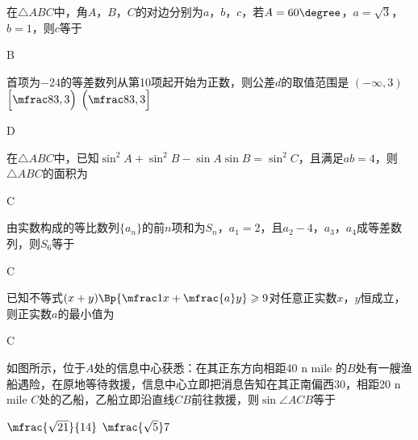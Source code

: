 \begin{exercise}
    在$\triangle{ABC}$中，角$A$，$B$，$C$的对边分别为$a$，$b$，$c$，若$A=60\degree$，$a=\sqrt3$，$b=1$，则$c$等于\xz
    \begin{answer}
      B
    \end{answer}
  \item%
    首项为$-24$的等差数列从第10项起开始为正数，则公差$d$的取值范围是\xz
       {$(-\infty,3)$}
       {$\Bigl[\mfrac83,3\Bigr)$}
       {$\Bigl(\mfrac83,3\Bigr]$}
    \begin{answer}
      D
    \end{answer}
  \item%
    在$\triangle{ABC}$中，已知$\sin^2A+\sin^2B-\sin A \sin B=\sin^2C$，且满足$ab=4$，则$\triangle{ABC}$的面积为\xz
    \begin{answer}
      C
    \end{answer}
  \item%
    由实数构成的等比数列$\{a_n\}$的前$n$项和为$S_n$，$a_1=2$，且$a_2-4$，$a_3$，$a_4$成等差数列，则$S_6$等于\xz
    \begin{answer}
      C
    \end{answer}
  \clearpage
  \item%
    已知不等式$(x+y)\Bp{\mfrac1x+\mfrac{a}y}\geqslant9$对任意正实数$x$，$y$恒成立，则正实数$a$的最小值为\xz
    \begin{answer}
      C
    \end{answer}
  \item%
    如图所示，位于$A$处的信息中心获悉：在其正东方向相距40 n mile 的$B$处有一艘渔船遇险，在原地等待救援，信息中心立即把消息告知在其正南偏西30\degree，相距20 n mile $C$处的乙船，乙船立即沿直线$CB$前往救援，则$\sin\angle{ACB}$等于\xz
    \begin{minipage}[t]{0.5\linewidth}\vspace{-0.5\baselineskip}
       {$\mfrac{\sqrt{21}}{14}$\hspace{5em}}
       {$\mfrac{\sqrt5}7$\hspace{5em}}

\end{minipage}
\end{exercise}
